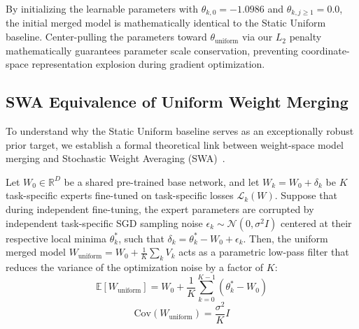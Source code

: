 By initializing the learnable parameters with $\theta_{k,0} = -1.0986$ and $\theta_{k,j \ge 1} = 0.0$, the initial merged model is mathematically identical to the Static Uniform baseline. Center-pulling the parameters toward $\theta_{\text{uniform}}$ via our $L_2$ penalty mathematically guarantees parameter scale conservation, preventing coordinate-space representation explosion during gradient optimization.

\subsection{SWA Equivalence of Uniform Weight Merging}
\label{subsec:swa_equivalence}
To understand why the Static Uniform baseline serves as an exceptionally robust prior target, we establish a formal theoretical link between weight-space model merging and Stochastic Weight Averaging (SWA)~\cite{izmailov2018averaging}.

\begin{theorem}
Let $W_0 \in \mathbb{R}^D$ be a shared pre-trained base network, and let $W_k = W_0 + \delta_k$ be $K$ task-specific experts fine-tuned on task-specific losses $\mathcal{L}_k(W)$. Suppose that during independent fine-tuning, the expert parameters are corrupted by independent task-specific SGD sampling noise $\epsilon_k \sim \mathcal{N}(0, \sigma^2 I)$ centered at their respective local minima $\theta_k^*$, such that $\delta_k = \theta_k^* - W_0 + \epsilon_k$. Then, the uniform merged model $W_{\text{uniform}} = W_0 + \frac{1}{K} \sum_k V_k$ acts as a parametric low-pass filter that reduces the variance of the optimization noise by a factor of $K$:
\begin{equation}
\mathbb{E}[W_{\text{uniform}}] = W_0 + \frac{1}{K} \sum_{k=0}^{K-1} (\theta_k^* - W_0)
\end{equation}
\begin{equation}
\mathrm{Cov}\left(W_{\text{uniform}}\right) = \frac{\sigma^2}{K} I
\end{equation}
\end{theorem}

